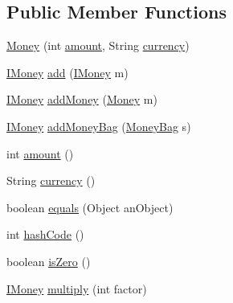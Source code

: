 \subsection*{Public Member Functions}
\begin{DoxyCompactItemize}
\item 
\mbox{\hyperlink{classes_1_1deusto_1_1testing_1_1junit_1_1_money_a6f1749eb364c59ed038f79cf8965e3bc}{Money}} (int \mbox{\hyperlink{classes_1_1deusto_1_1testing_1_1junit_1_1_money_a9bef5d9027f270e8ce0303e4f929bbd5}{amount}}, String \mbox{\hyperlink{classes_1_1deusto_1_1testing_1_1junit_1_1_money_aefa4aaf62bb653eae25851d98ae02dcb}{currency}})
\item 
\mbox{\hyperlink{interfacees_1_1deusto_1_1testing_1_1junit_1_1_i_money}{I\+Money}} \mbox{\hyperlink{classes_1_1deusto_1_1testing_1_1junit_1_1_money_a6a3d64861c49dee89ffd0ed0c576045d}{add}} (\mbox{\hyperlink{interfacees_1_1deusto_1_1testing_1_1junit_1_1_i_money}{I\+Money}} m)
\item 
\mbox{\hyperlink{interfacees_1_1deusto_1_1testing_1_1junit_1_1_i_money}{I\+Money}} \mbox{\hyperlink{classes_1_1deusto_1_1testing_1_1junit_1_1_money_a223a447d5daf23b5e9cc0f551b72e328}{add\+Money}} (\mbox{\hyperlink{classes_1_1deusto_1_1testing_1_1junit_1_1_money}{Money}} m)
\item 
\mbox{\hyperlink{interfacees_1_1deusto_1_1testing_1_1junit_1_1_i_money}{I\+Money}} \mbox{\hyperlink{classes_1_1deusto_1_1testing_1_1junit_1_1_money_ad9a107a6884026a1bb12102d3a8a5b41}{add\+Money\+Bag}} (\mbox{\hyperlink{classes_1_1deusto_1_1testing_1_1junit_1_1_money_bag}{Money\+Bag}} s)
\item 
int \mbox{\hyperlink{classes_1_1deusto_1_1testing_1_1junit_1_1_money_a9bef5d9027f270e8ce0303e4f929bbd5}{amount}} ()
\item 
String \mbox{\hyperlink{classes_1_1deusto_1_1testing_1_1junit_1_1_money_aefa4aaf62bb653eae25851d98ae02dcb}{currency}} ()
\item 
boolean \mbox{\hyperlink{classes_1_1deusto_1_1testing_1_1junit_1_1_money_a2356df38b8e9ecdd969bab11d6dd301b}{equals}} (Object an\+Object)
\item 
int \mbox{\hyperlink{classes_1_1deusto_1_1testing_1_1junit_1_1_money_af6cfb5b27bf97170d990dea12de04f37}{hash\+Code}} ()
\item 
boolean \mbox{\hyperlink{classes_1_1deusto_1_1testing_1_1junit_1_1_money_a797658a03260b535e9a36ebbcc3b19c9}{is\+Zero}} ()
\item 
\mbox{\hyperlink{interfacees_1_1deusto_1_1testing_1_1junit_1_1_i_money}{I\+Money}} \mbox{\hyperlink{classes_1_1deusto_1_1testing_1_1junit_1_1_money_a02c7d4e9013710f70d1d46e9c9ebae88}{multiply}} (int factor)

\end{DoxyCompactItemize}

